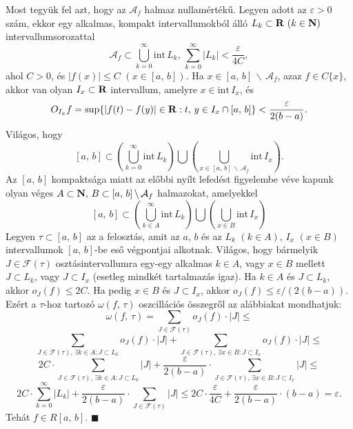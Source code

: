 Most tegyük fel azt, hogy az $\mathcal{A}_f$ halmaz nullamértékű. Legyen adott az $\varepsilon > 0$ szám, ekkor egy alkalmas, kompakt intervallumokból álló $L_k \subset \mathbf{R} \, \, (k \in \mathbf{N})$ intervallumsorozattal
\[
	\mathcal{A}_f \subset \bigcup_{k=0}^\infty \text{int} \, L_k, \, \sum_{k=0}^\infty |L_k| <\frac{\varepsilon}{4C},
\]
ahol $C >0$, és $|f(x)| \leq C \, \, (x \in [a, \, b])$. Ha $x \in [a, \, b] \, \backslash \, \mathcal{A}_f$, azaz $f \in C\{x\}$, akkor van olyan $I_x \subset \mathbf{R}$ intervallum, amelyre $x \in \text{int} \, I_x$, és
\[
	O_{I_x}f = \sup\{ |f(t) - f(y)| \in \mathbf{R} : t, \, y \in I_x \cap [a, \, b]\} < \frac{\varepsilon}{2(b-a)}.
\]
Világos, hogy
\[
	[a, \, b] \subset \left(\bigcup_{k=0}^\infty \text{int} \, L_k\right) \bigcup \left(\bigcup_{x \in [a, \, b] \, \backslash \, \mathcal{A}_f} \text{int} \, I_x\right).
\]
Az $[a, \, b]$ kompaktsága miatt az előbbi nyílt lefedést figyelembe véve kapunk olyan véges $A \subset \mathbf{N}, \, B \subset [a, \, b] \, \backslash \, \mathcal{A}_f$ halmazokat, amelyekkel
\[
	[a, \, b] \subset \left(\bigcup_{k \in A}^\infty \text{int} \, L_k\right) \bigcup \left(\bigcup_{x \in B} \text{int} \, I_x\right)
\]
Legyen $\tau \subset [a, \, b]$ az a felosztás, amit az $a, \, b$ és az $L_k \, \, (k \in A), \, I_x \, \, (x \in B)$ intervallumok $[a, \, b]$-be eső végpontjai alkotnak. Világos, hogy bármelyik $J \in \mathcal{F}(\tau)$ osztásintervallumra egy-egy alkalmas $k \in A$, vagy $x \in B$ mellett $J \subset L_k$, vagy $J \subset I_x$ (esetleg mindkét tartalmazás igaz). Ha $k \in A$ és $J \subset L_k$, akkor $o_J(f) \leq 2C$. Ha pedig $x \in B$ és $J \subset I_x$, akkor $o_J(f) \leq \varepsilon / (2(b-a))$. Ezért a $\tau$-hoz tartozó $\omega(f, \, \tau)$ oszcillációs összegről az alábbiakat mondhatjuk:
\[
	\omega(f, \, \tau) = \sum_{J \in \mathcal{F}(\tau) } o_J(f) \cdot |J| \leq
\]
\[
	\sum_{J \in \mathcal{F}(\tau), \, \exists k \in A : J \subset L_k} o_J(f) \cdot |J| + \sum_{J \in \mathcal{F}(\tau), \, \exists x \in B : J \subset I_x} o_J(f) \cdot |J| \leq
\]
\[
	2C \cdot \sum_{J \in \mathcal{F}(\tau), \, \exists k \in A : J \subset L_k} |J| + \frac{\varepsilon}{2(b-a)} \cdot \sum_{J \in \mathcal{F}(\tau), \, \exists x \in B : J \subset I_x} |J| \leq
\]
\[
	2C \cdot \sum_{k=0}^\infty |L_k| + \frac{\varepsilon}{2(b-a)} \cdot \sum_{J \in \mathcal{F}(\tau)} |J| \leq 2C \cdot \frac{\varepsilon}{4C} + \frac{\varepsilon}{2(b-a)} \cdot (b-a) = \varepsilon.
\]
Tehát $f \in R[a, \, b]$. $\blacksquare$